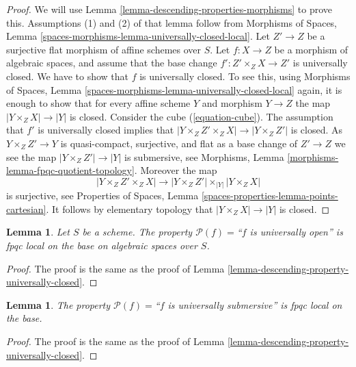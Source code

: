 \documentclass{stacks-project}
\theoremstyle{plain}
\newtheorem{lemma}[subsection]{Lemma}
\theoremstyle{definition}
\theoremstyle{remark}
\numberwithin{equation}{subsection}
\begin{document}
\begin{proof}
We will use
Lemma \ref{lemma-descending-properties-morphisms}
to prove this. Assumptions (1) and (2) of that lemma follow from
Morphisms of Spaces,
Lemma \ref{spaces-morphisms-lemma-universally-closed-local}.
Let $Z' \to Z$ be a surjective flat morphism of affine schemes over $S$.
Let $f : X \to Z$ be a morphism of algebraic spaces, and assume
that the base change $f' : Z' \times_Z X \to Z'$ is universally closed.
We have to show that $f$ is universally closed. To see this, using
Morphisms of Spaces,
Lemma \ref{spaces-morphisms-lemma-universally-closed-local}
again, it is enough to show that for every affine scheme $Y$ and
morphism $Y \to Z$ the map $|Y \times_Z X| \to |Y|$ is closed.
Consider the cube (\ref{equation-cube}).
The assumption that $f'$ is universally closed implies that
$|Y \times_Z Z' \times_Z X| \to |Y \times_Z Z'|$ is closed.
As $Y \times_Z Z' \to Y$ is quasi-compact, surjective, and flat
as a base change of $Z' \to Z$
we see the map $|Y \times_Z Z'| \to |Y|$ is submersive, see
Morphisms, Lemma \ref{morphisms-lemma-fpqc-quotient-topology}.
Moreover the map
$$
|Y \times_Z Z' \times_Z X|
\longrightarrow
|Y \times_Z Z'| \times_{|Y|} |Y \times_Z X|
$$
is surjective, see
Properties of Spaces, Lemma \ref{spaces-properties-lemma-points-cartesian}.
It follows by elementary topology that $|Y \times_Z X| \to |Y|$ is closed.
\end{proof}

\begin{lemma}
\label{lemma-descending-property-universally-open}
Let $S$ be a scheme.
The property $\mathcal{P}(f) =$``$f$ is universally open''
is fpqc local on the base on algebraic spaces over $S$.
\end{lemma}

\begin{proof}
The proof is the same as the proof of
Lemma \ref{lemma-descending-property-universally-closed}.
\end{proof}

\begin{lemma}
\label{lemma-descending-property-universally-submersive}
The property $\mathcal{P}(f) =$``$f$ is universally submersive''
is fpqc local on the base.
\end{lemma}

\begin{proof}
The proof is the same as the proof of
Lemma \ref{lemma-descending-property-universally-closed}.
\end{proof}
\end{document}
